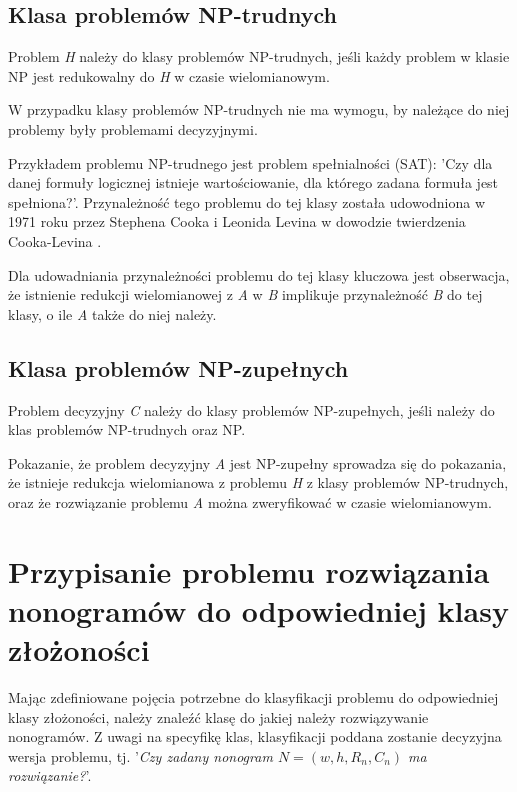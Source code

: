\subsection{Klasa problemów NP-trudnych}
\begin{definition}
    Problem \textit{H} należy do klasy problemów NP-trudnych, jeśli każdy problem w klasie NP 
jest redukowalny do \textit{H} w czasie wielomianowym.
\end{definition}
    W przypadku klasy problemów NP-trudnych nie ma wymogu, by należące do niej problemy były
problemami decyzyjnymi.
\begin{example}
    Przykładem problemu NP-trudnego jest problem spełnialności (SAT): 'Czy dla danej formuły logicznej
istnieje wartościowanie, dla którego zadana formuła jest spełniona?'. Przynależność tego problemu
do tej klasy została udowodniona w 1971 roku przez Stephena Cooka i Leonida Levina w dowodzie
twierdzenia Cooka-Levina \cite{Cook-Levin}.
\end{example}
    Dla udowadniania przynależności problemu do tej klasy kluczowa jest obserwacja, że istnienie
redukcji wielomianowej z \textit{A} w \textit{B} implikuje przynależność \textit{B} do tej klasy,
o ile \textit{A} także do niej należy.

\subsection{Klasa problemów NP-zupełnych}
\begin{definition}
    Problem decyzyjny \textit{C} należy do klasy problemów NP-zupełnych, jeśli należy do klas problemów
NP-trudnych oraz NP.
\end{definition}
\begin{corollary}
    Pokazanie, że problem decyzyjny \textit{A} jest NP-zupełny sprowadza się do pokazania, że istnieje redukcja
wielomianowa z problemu \textit{H} z klasy problemów NP-trudnych, oraz że rozwiązanie problemu \textit{A}
można zweryfikować w czasie wielomianowym.
\end{corollary}


\section{Przypisanie problemu rozwiązania nonogramów do odpowiedniej klasy złożoności}

    Mając zdefiniowane pojęcia potrzebne do klasyfikacji problemu do odpowiedniej klasy złożoności,
należy znaleźć klasę do jakiej należy rozwiązywanie nonogramów. Z uwagi na specyfikę klas, klasyfikacji
poddana zostanie decyzyjna wersja problemu, tj. 
'\textit{Czy zadany nonogram $N = (w, h, R_n, C_n)$ ma rozwiązanie?}'.

